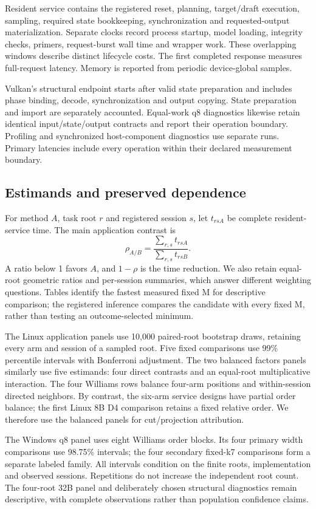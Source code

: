 Resident service contains the registered reset, planning, target/draft execution, sampling, required state bookkeeping, synchronization and requested-output materialization. Separate clocks record process startup, model loading, integrity checks, primers, request-burst wall time and wrapper work. These overlapping windows describe distinct lifecycle costs. The first completed response measures full-request latency. Memory is reported from periodic device-global samples.

Vulkan's structural endpoint starts after valid state preparation and includes phase binding, decode, synchronization and output copying. State preparation and import are separately accounted. Equal-work q8 diagnostics likewise retain identical input/state/output contracts and report their operation boundary. Profiling and synchronized host-component diagnostics use separate runs. Primary latencies include every operation within their declared measurement boundary.

\subsection{Estimands and preserved dependence}
For method $A$, task root $r$ and registered session $s$, let $t_{rsA}$ be complete resident-service time. The main application contrast is
\begin{equation}
 \rho_{A/B}=\frac{\sum_{r,s}t_{rsA}}{\sum_{r,s}t_{rsB}}.
 \label{eq:ratio}
\end{equation}
A ratio below 1 favors $A$, and $1-\rho$ is the time reduction. We also retain equal-root geometric ratios and per-session summaries, which answer different weighting questions. Tables identify the fastest measured fixed M for descriptive comparison; the registered inference compares the candidate with every fixed M, rather than testing an outcome-selected minimum.

The Linux application panels use 10,000 paired-root bootstrap draws, retaining every arm and session of a sampled root. Five fixed comparisons use 99\% percentile intervals with Bonferroni adjustment. The two balanced factors panels similarly use five estimands: four direct contrasts and an equal-root multiplicative interaction. The four Williams rows balance four-arm positions and within-session directed neighbors. By contrast, the six-arm service designs have partial order balance; the first Linux 8B D4 comparison retains a fixed relative order. We therefore use the balanced panels for cut/projection attribution.

The Windows q8 panel uses eight Williams order blocks. Its four primary width comparisons use 98.75\% intervals; the four secondary fixed-k7 comparisons form a separate labeled family. All intervals condition on the finite roots, implementation and observed sessions. Repetitions do not increase the independent root count. The four-root 32B panel and deliberately chosen structural diagnostics remain descriptive, with complete observations rather than population confidence claims.
